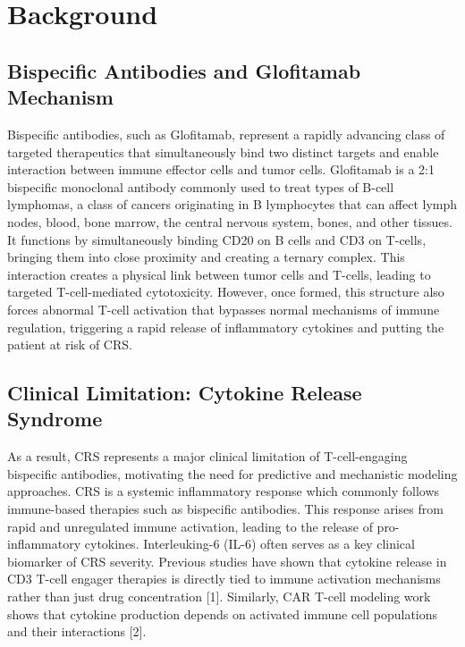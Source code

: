 \documentclass[11pt]{article}
\begin{document}
\section{Background}

\subsection{Bispecific Antibodies and Glofitamab Mechanism}

Bispecific antibodies, such as Glofitamab, represent a rapidly advancing class of targeted therapeutics that simultaneously bind two distinct targets and enable interaction between immune effector cells and tumor cells. Glofitamab is a 2:1 bispecific monoclonal antibody commonly used to treat types of B-cell lymphomas, a class of cancers originating in B lymphocytes that can affect lymph nodes, blood, bone marrow, the central nervous system, bones, and other tissues. It functions by simultaneously binding CD20 on B cells and CD3 on T-cells, bringing them into close proximity and creating a ternary complex. This interaction creates a physical link between tumor cells and T-cells, leading to targeted T-cell-mediated cytotoxicity. However, once formed, this structure also forces abnormal T-cell activation that bypasses normal mechanisms of immune regulation, triggering a rapid release of inflammatory cytokines and putting the patient at risk of CRS.
\par\medskip

\subsection{Clinical Limitation: Cytokine Release Syndrome}

As a result, CRS represents a major clinical limitation of T-cell-engaging bispecific antibodies, motivating the need for predictive and mechanistic modeling approaches. CRS is a systemic inflammatory response which commonly follows immune-based therapies such as bispecific antibodies. This response arises from rapid and unregulated immune activation, leading to the release of pro-inflammatory cytokines. Interleuking-6 (IL-6) often serves as a key clinical biomarker of CRS severity. Previous studies have shown that cytokine release in CD3 T-cell engager therapies is directly tied to immune activation mechanisms rather than just drug concentration [1]. Similarly, CAR T-cell modeling work shows that cytokine production depends on activated immune cell populations and their interactions [2].
\par\medskip
\end{document}
